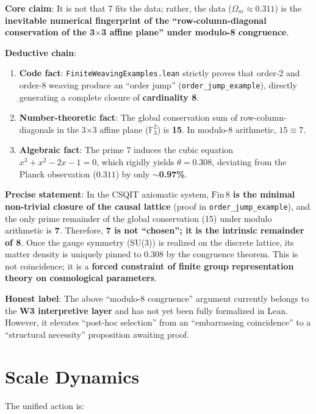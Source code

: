 \documentclass[aps,prd,twocolumn,nofootinbib,floatfix]{revtex4-2}
\begin{document}
\textbf{Core claim}: It is not that 7 fits the data; rather, the data ($\Omega_m \approx 0.311$) is the \textbf{inevitable numerical fingerprint of the ``row-column-diagonal conservation of the 3$\times$3 affine plane'' under modulo-8 congruence}.

\textbf{Deductive chain}:
\begin{enumerate}
    \item \textbf{Code fact}: \texttt{FiniteWeavingExamples.lean} strictly proves that order-2 and order-8 weaving produce an ``order jump'' (\texttt{order\_jump\_example}), directly generating a complete closure of \textbf{cardinality 8}.
    \item \textbf{Number-theoretic fact}: The global conservation sum of row-column-diagonals in the 3$\times$3 affine plane ($\mathbb{F}_3^2$) is \textbf{15}. In modulo-8 arithmetic, $15 \equiv 7$.
    \item \textbf{Algebraic fact}: The prime 7 induces the cubic equation $x^3 + x^2 - 2x - 1 = 0$, which rigidly yields $\theta = 0.308$, deviating from the Planck observation ($0.311$) by only \textbf{$\sim$0.97\%}.
\end{enumerate}

\textbf{Precise statement}: In the CSQIT axiomatic system, \textbf{$\text{Fin}\,8$ is the minimal non-trivial closure of the causal lattice} (proof in \texttt{order\_jump\_example}), and the only prime remainder of the global conservation (15) under modulo arithmetic is \textbf{7}. Therefore, \textbf{7 is not ``chosen''; it is the intrinsic remainder of 8}. Once the gauge symmetry (SU(3)) is realized on the discrete lattice, its matter density is uniquely pinned to 0.308 by the congruence theorem. This is not coincidence; it is a \textbf{forced constraint of finite group representation theory on cosmological parameters}.

\medskip

\noindent\textbf{Honest label}: The above ``modulo-8 congruence'' argument currently belongs to the \textbf{W3 interpretive layer} and has not yet been fully formalized in Lean. However, it elevates ``post-hoc selection'' from an ``embarrassing coincidence'' to a ``structural necessity'' proposition awaiting proof.

\section{Scale Dynamics}

The unified action is:
\end{document}
